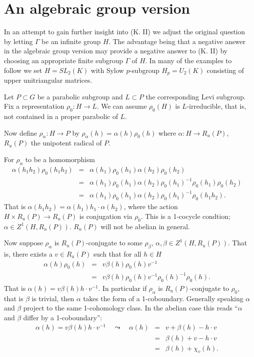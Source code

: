 \section{An algebraic group version}

In an attempt to gain further insight into (K. II) we adjust the original question by letting $\Gamma$ be an infinite group $H$. The advantage being that a negative answer in the algebraic group version may provide a negative answer to (K. II) by choosing an appropriate finite subgroup $\Gamma$ of $H$. In many of the examples to follow we set $H = SL_2(K)$ with Sylow $p$-subgroup $H_p = U_2(K)$ consisting of upper unitriangular matrices. 

Let $P \subset G$ be a parabolic subgroup and $L \subset P$ the corresponding Levi subgroup. Fix a representation $\rho_0:H\rightarrow L$. We can assume $\rho_0(H)$ is $L$-irreducible, that is, not contained in a proper parabolic of $L$. 

Now define $\rho_\alpha:H \rightarrow P$ by $\rho_\alpha(h) = \alpha(h)\rho_0(h)$ where $\alpha:H\rightarrow R_u(P)$, $R_u(P)$ the unipotent radical of $P$. 

For $\rho_\alpha$ to be a homomorphism
\begin{eqnarray*}
	\alpha(h_1h_2)\rho_0(h_1h_2) &=& \alpha(h_1)\rho_0(h_1)\alpha(h_2)\rho_0(h_2) \\
	 &=& \alpha(h_1)\rho_0(h_1)\alpha(h_2)\rho_0(h_1)^{-1}\rho_0(h_1)\rho_0(h_2) \\
	 &=& \alpha(h_1)\rho_0(h_1)\alpha(h_2)\rho_0(h_1)^{-1}\rho_0(h_1h_2).
\end{eqnarray*}
That is $\alpha(h_1h_2) = \alpha(h_1) h_1\cdot\alpha(h_2)$, where the action $H \times R_u(P) \rightarrow R_u(P)$ is conjugation via $\rho_0$. This is a 1-cocycle condtion; $\alpha\in Z^1(H, R_u(P))$. $R_u(P)$ will not be abelian in general.

Now suppose $\rho_\alpha$ is $R_u(P)$-conjugate to some $\rho_\beta$, $\alpha, \beta \in Z^1(H, R_u(P))$. That is, there exists a $v \in R_u(P)$ such that for all $h\in H$
\begin{eqnarray*}
	\alpha(h)\rho_0(h) &=& v\beta(h)\rho_0(h)v^{-1} \\
	&=& v\beta(h)\rho_0(h)v^{-1}\rho_0(h)^{-1}\rho_0(h).
\end{eqnarray*}
That is $\alpha(h) = v\beta(h)h\cdot v^{-1}$. In particular if $\rho_\alpha$ is $R_u(P)$-conjugate to $\rho_0$, that is $\beta$ is trivial, then $\alpha$ takes the form of a 1-coboundary. Generally speaking $\alpha$ and $\beta$ project to the same 1-cohomology class. In the abelian case this reads ``$\alpha$ and $\beta$ differ by a 1-coboundary'':
\begin{eqnarray*}
	\alpha(h) = v\beta(h)h\cdot v^{-1} \quad\leadsto \quad\alpha(h) &=& v + \beta(h) - h\cdot v \\
	&=& \beta(h) + v - h\cdot v \\
	&=& \beta(h) + \chi_v(h).
\end{eqnarray*}

